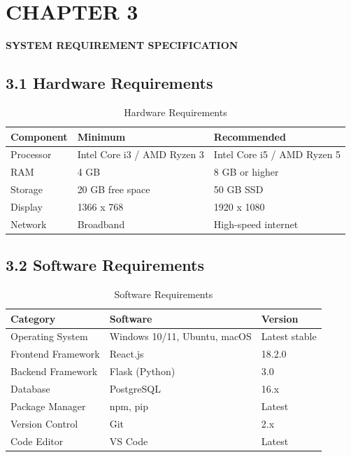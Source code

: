\documentclass[12pt,a4paper]{report}
\begin{document}
\setcounter{page}{15}

\chapter*{CHAPTER 3}

\begin{center}
    \textbf{\large SYSTEM REQUIREMENT SPECIFICATION}
\end{center}

\section*{3.1 Hardware Requirements}

\begin{table}[h]
\centering
\small
\begin{tabular}{|p{3cm}|p{4cm}|p{4cm}|}
\hline
\textbf{Component} & \textbf{Minimum} & \textbf{Recommended} \\
\hline
Processor & Intel Core i3 / AMD Ryzen 3 & Intel Core i5 / AMD Ryzen 5 \\
\hline
RAM & 4 GB & 8 GB or higher \\
\hline
Storage & 20 GB free space & 50 GB SSD \\
\hline
Display & 1366 x 768 & 1920 x 1080 \\
\hline
Network & Broadband & High-speed internet \\
\hline
\end{tabular}
\caption{Hardware Requirements}
\end{table}

\section*{3.2 Software Requirements}

\begin{table}[h]
\centering
\small
\begin{tabular}{|p{3.5cm}|p{4.5cm}|p{3.5cm}|}
\hline
\textbf{Category} & \textbf{Software} & \textbf{Version} \\
\hline
Operating System & Windows 10/11, Ubuntu, macOS & Latest stable \\
\hline
Frontend Framework & React.js & 18.2.0 \\
\hline
Backend Framework & Flask (Python) & 3.0 \\
\hline
Database & PostgreSQL & 16.x \\
\hline
Package Manager & npm, pip & Latest \\
\hline
Version Control & Git & 2.x \\
\hline
Code Editor & VS Code & Latest \\
\hline
\end{tabular}
\caption{Software Requirements}
\end{table}
\end{document}
